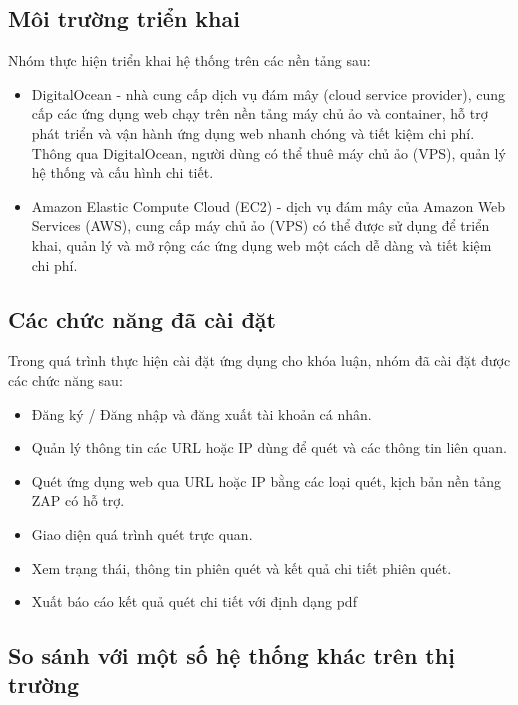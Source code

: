 \subsection{Môi trường triển khai}

\tab Nhóm thực hiện triển khai hệ thống trên các nền tảng sau:

\begin{itemize}
    \item DigitalOcean - nhà cung cấp dịch vụ đám mây (cloud service provider), cung cấp các ứng dụng web chạy trên nền tảng máy chủ ảo và container, hỗ trợ phát triển và vận hành ứng dụng web nhanh chóng và tiết kiệm chi phí. Thông qua DigitalOcean, người dùng có thể thuê máy chủ ảo (VPS), quản lý hệ thống và cấu hình chi tiết.
    \item Amazon Elastic Compute Cloud (EC2) - dịch vụ đám mây của Amazon Web Services (AWS), cung cấp máy chủ ảo (VPS) có thể được sử dụng để triển khai, quản lý và mở rộng các ứng dụng web một cách dễ dàng và tiết kiệm chi phí.
\end{itemize}

\subsection{Các chức năng đã cài đặt}

\tab Trong quá trình thực hiện cài đặt ứng dụng cho khóa luận, nhóm đã cài đặt được các chức năng sau:

\begin{itemize}
    \item Đăng ký / Đăng nhập và đăng xuất tài khoản cá nhân.
    \item Quản lý thông tin các URL hoặc IP dùng để quét và các thông tin liên quan.
    \item Quét ứng dụng web qua URL hoặc IP bằng các loại quét, kịch bản nền tảng ZAP có hỗ trợ.
    \item Giao diện quá trình quét trực quan.
    \item Xem trạng thái, thông tin phiên quét và kết quả chi tiết phiên quét.
    \item Xuất báo cáo kết quả quét chi tiết với định dạng pdf
\end{itemize}

\subsection{So sánh với một số hệ thống khác trên thị trường}

